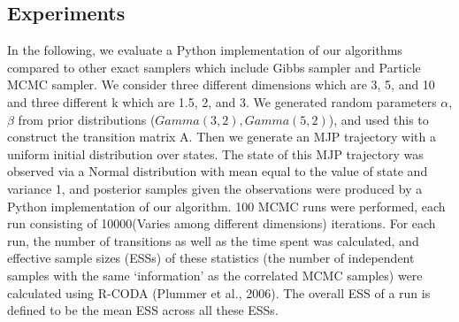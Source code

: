 \subsection{Experiments}
In the following, we evaluate a Python implementation of our algorithms compared to other exact samplers which include Gibbs sampler and Particle MCMC sampler. We consider three different dimensions which are 3, 5, and 10 and three different k which are 1.5, 2, and 3. We generated random parameters $\alpha$, $\beta$ from prior distributions ($Gamma(3,2), Gamma(5, 2)$), and used this to construct the transition matrix A. Then we generate an MJP trajectory with a uniform initial distribution over states. The state of this MJP trajectory was observed via a Normal distribution with mean equal to the value of state and variance 1, and posterior samples given the observations were produced by a Python implementation of our algorithm. 100 MCMC runs were performed, each run consisting of 10000(Varies among different dimensions) iterations. For each run, the number of transitions as well as the time spent was calculated, and effective sample sizes (ESSs) of these statistics (the number of independent samples with the same `information' as the correlated MCMC samples) were calculated using R-CODA (Plummer et al., 2006). The overall ESS of a run is defined to be the mean ESS across all these ESSs.

